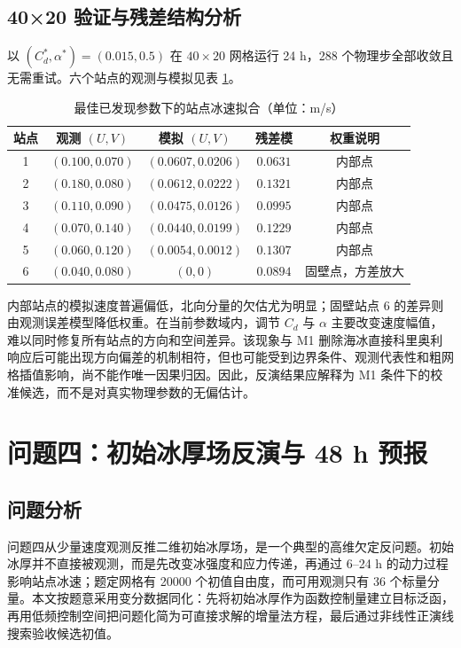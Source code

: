 \documentclass[UTF8,fontset=none]{ctexart}
\begin{document}
\subsection{40×20 验证与残差结构分析}

以 $(C_d^*,\alpha^*)=(0.015,0.5)$ 在 $40\times20$ 网格运行 24 h，288 个物理步全部收敛且无需重试。六个站点的观测与模拟见表 \ref{tab:p3_station}。

\begin{table}[H]
\centering
\caption{最佳已发现参数下的站点冰速拟合（单位：m/s）}
\renewcommand{\arraystretch}{1.3}
\begin{tabular*}{\textwidth}{@{\extracolsep{\fill}}ccccc@{}}
\toprule[1pt]
站点 & 观测 $(U,V)$ & 模拟 $(U,V)$ & 残差模 & 权重说明\\
\midrule
1 & $(0.100,0.070)$ & $(0.0607,0.0206)$ & $0.0631$ & 内部点\\
2 & $(0.180,0.080)$ & $(0.0612,0.0222)$ & $0.1321$ & 内部点\\
3 & $(0.110,0.090)$ & $(0.0475,0.0126)$ & $0.0995$ & 内部点\\
4 & $(0.070,0.140)$ & $(0.0440,0.0199)$ & $0.1229$ & 内部点\\
5 & $(0.060,0.120)$ & $(0.0054,0.0012)$ & $0.1307$ & 内部点\\
6 & $(0.040,0.080)$ & $(0,0)$ & $0.0894$ & 固壁点，方差放大\\
\bottomrule[1pt]
\end{tabular*}
\label{tab:p3_station}
\end{table}

内部站点的模拟速度普遍偏低，北向分量的欠估尤为明显；固壁站点 6 的差异则由观测误差模型降低权重。在当前参数域内，调节 $C_d$ 与 $\alpha$ 主要改变速度幅值，难以同时修复所有站点的方向和空间差异。该现象与 M1 删除海冰直接科里奥利响应后可能出现方向偏差的机制相符，但也可能受到边界条件、观测代表性和粗网格插值影响，尚不能作唯一因果归因。因此，反演结果应解释为 M1 条件下的校准候选，而不是对真实物理参数的无偏估计。

\section{问题四：初始冰厚场反演与 48 h 预报}

\subsection{问题分析}

问题四从少量速度观测反推二维初始冰厚场，是一个典型的高维欠定反问题。初始冰厚并不直接被观测，而是先改变冰强度和应力传递，再通过 6--24 h 的动力过程影响站点冰速；题定网格有 20000 个初值自由度，而可用观测只有 36 个标量分量。本文按题意采用变分数据同化：先将初始冰厚作为函数控制量建立目标泛函，再用低频控制空间把问题化简为可直接求解的增量法方程，最后通过非线性正演线搜索验收候选初值。
\end{document}
